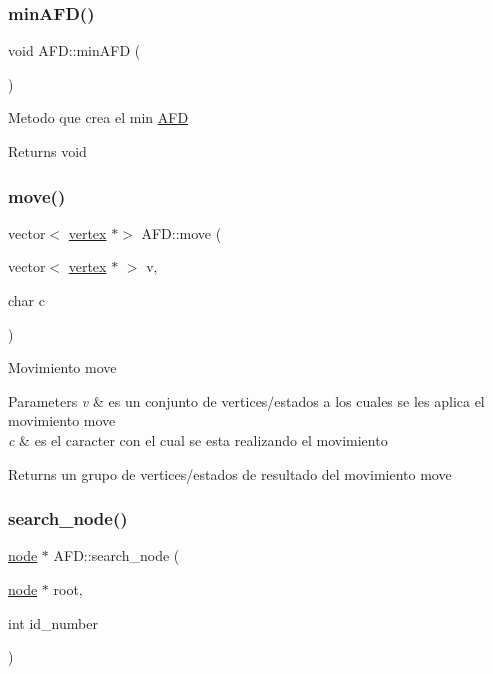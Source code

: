 \subsubsection{\texorpdfstring{min\+A\+F\+D()}{minAFD()}}
{\footnotesize\ttfamily void A\+F\+D\+::min\+A\+FD (\begin{DoxyParamCaption}{ }\end{DoxyParamCaption})}

Metodo que crea el min \hyperlink{class_a_f_d}{A\+FD} \begin{DoxyReturn}{Returns}
void 
\end{DoxyReturn}
\hypertarget{class_a_f_d_a4505bb76534ae8c4df01c164912f5c52}{}\label{class_a_f_d_a4505bb76534ae8c4df01c164912f5c52} 
\subsubsection{\texorpdfstring{move()}{move()}}
{\footnotesize\ttfamily vector$<$ \hyperlink{structvertex}{vertex} $\ast$$>$ A\+F\+D\+::move (\begin{DoxyParamCaption}\item[{vector$<$ \hyperlink{structvertex}{vertex} $\ast$ $>$}]{v,  }\item[{char}]{c }\end{DoxyParamCaption})}

Movimiento move 
\begin{DoxyParams}{Parameters}
{\em v} & es un conjunto de vertices/estados a los cuales se les aplica el movimiento move \\
\hline
{\em c} & es el caracter con el cual se esta realizando el movimiento \\
\hline
\end{DoxyParams}
\begin{DoxyReturn}{Returns}
un grupo de vertices/estados de resultado del movimiento move 
\end{DoxyReturn}
\hypertarget{class_a_f_d_a4dfefc5091e8654160f65db0bc4fc0b0}{}\label{class_a_f_d_a4dfefc5091e8654160f65db0bc4fc0b0} 
\subsubsection{\texorpdfstring{search\+\_\+node()}{search\_node()}}
{\footnotesize\ttfamily \hyperlink{structnode}{node} $\ast$ A\+F\+D\+::search\+\_\+node (\begin{DoxyParamCaption}\item[{\hyperlink{structnode}{node} $\ast$}]{root,  }\item[{int}]{id\+\_\+number }\end{DoxyParamCaption})}


